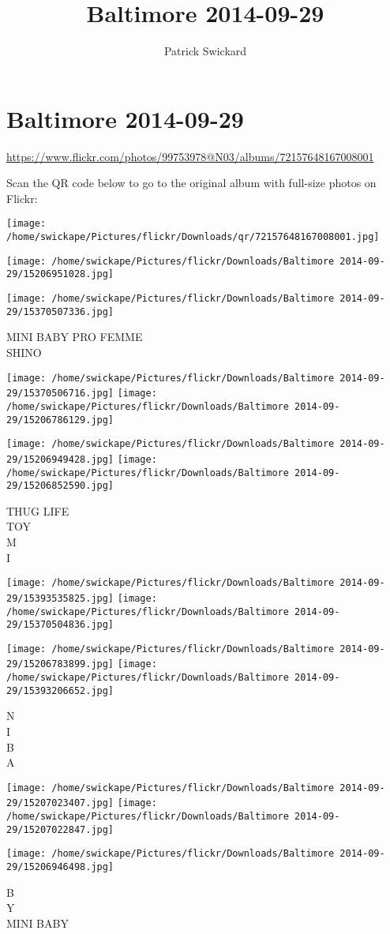 \documentclass[10pt,letterpaper]{article}
\title{Baltimore 2014-09-29}
\author{Patrick Swickard}
\date{}
\begin{document}
\section*{Baltimore 2014-09-29}

\url{https://www.flickr.com/photos/99753978@N03/albums/72157648167008001}

Scan the QR code below to go to the original album with full-size photos on Flickr:

\texttt{[image: /home/swickape/Pictures/flickr/Downloads/qr/72157648167008001.jpg]}
\pagebreak

\texttt{[image: /home/swickape/Pictures/flickr/Downloads/Baltimore 2014-09-29/15206951028.jpg]}

\vspace{0.25in}
\texttt{[image: /home/swickape/Pictures/flickr/Downloads/Baltimore 2014-09-29/15370507336.jpg]}

MINI BABY PRO FEMME\\
SHINO
\pagebreak

\texttt{[image: /home/swickape/Pictures/flickr/Downloads/Baltimore 2014-09-29/15370506716.jpg]}
\texttt{[image: /home/swickape/Pictures/flickr/Downloads/Baltimore 2014-09-29/15206786129.jpg]}

\texttt{[image: /home/swickape/Pictures/flickr/Downloads/Baltimore 2014-09-29/15206949428.jpg]}
\texttt{[image: /home/swickape/Pictures/flickr/Downloads/Baltimore 2014-09-29/15206852590.jpg]}

THUG LIFE\\
TOY\\
M\\
I
\pagebreak

\texttt{[image: /home/swickape/Pictures/flickr/Downloads/Baltimore 2014-09-29/15393535825.jpg]}
\texttt{[image: /home/swickape/Pictures/flickr/Downloads/Baltimore 2014-09-29/15370504836.jpg]}

\texttt{[image: /home/swickape/Pictures/flickr/Downloads/Baltimore 2014-09-29/15206783899.jpg]}
\texttt{[image: /home/swickape/Pictures/flickr/Downloads/Baltimore 2014-09-29/15393206652.jpg]}

N\\
I\\
B\\
A
\pagebreak

\texttt{[image: /home/swickape/Pictures/flickr/Downloads/Baltimore 2014-09-29/15207023407.jpg]}
\texttt{[image: /home/swickape/Pictures/flickr/Downloads/Baltimore 2014-09-29/15207022847.jpg]}

\vspace{0.25in}
\texttt{[image: /home/swickape/Pictures/flickr/Downloads/Baltimore 2014-09-29/15206946498.jpg]}

B\\
Y\\
MINI BABY
\pagebreak
\end{document}
